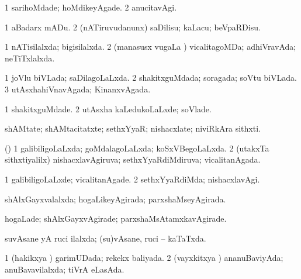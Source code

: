 \bentry
{} 
\gl{\kirxvi}
\expl{}
\bmng
\bnum
\num{1} sarihoMdade; hoMdikeyAgade. 
\num{2} anucitavAgi. 
\enum
\emng
\eentry

\bentry
{} 
\gl{\sakirx}
\expl{}
\bmng
\bnum
\num{1} aBadarx mADu. 
\num{2} (nATiruvudanunx) saDilisu; kaLacu; beVpaRDisu. 
\enum
\emng
\eentry

\bentry
{} 
\gl{\gu}
\expl{}
\bmng
\bnum
\num{1} nATisilalxda; bigisilalxda. 
\num{2} (manasusx \mo vugaLa \vi) vicalitagoMDa; adhiVravAda; neTiTxlalxda. 
\enum
\emng
\eentry

\bentry
{} 
\gl{\gu}
\expl{}
\bmng
\bnum
\num{1} joVlu biVLada; saDilagoLaLxda. 
\num{2} shakitxguMdada; soragada; soVtu biVLada. 
\num{3} utAsxhahiVnavAgada; KinanxvAgada. 
\enum
\emng
\eentry

\bentry
{} 
\gl{\kirxvi}
\expl{}
\bmng
\bnum
\num{1} shakitxguMdade. 
\num{2} utAsxha kaLedukoLaLxde; soVlade. 
\enum
\emng
\eentry

\bentry
{} 
\gl{\nA}
\expl{}
\bmng
 shAMtate; shAMtacitatxte; sethxYyaR; nishacxlate; niviRkAra sithxti. 
\emng
\eentry

\bentry
{} 
\gl{\gu}
\expl{}
\bmng
(\AmA) 
\bnum
\num{1} galibiligoLaLxda; goMdalagoLaLxda; koSxVBegoLaLxda. 
\num{2} (utakxTa sithxtiyalilx) nishacxlavAgiruva; sethxYyaRdiMdiruva; vicalitanAgada. 
\enum
\emng
\eentry

\bentry
{} 
\gl{\kirxvi}
\expl{}
\bmng
\bnum
\num{1} galibiligoLaLxde; vicalitanAgade. 
\num{2} sethxYyaRdiMda; nishacxlavAgi. 
\enum
\emng
\eentry

\bentry
{} 
\gl{\gu}
\expl{}
\bmng
 shAlxGayxvalalxda; hogaLikeyAgirada; parxshaMseyAgirada. 
\emng
\eentry

\bentry
{} 
\gl{\kirxvi}
\expl{}
\bmng
 hogaLade; shAlxGayxvAgirade; parxshaMsAtamxkavAgirade. 
\emng
\eentry

\bentry
{} 
\gl{\gu}
\expl{}
\bmng
suvAsane yA ruci ilalxda; (su)vAsane, ruci -- kaTaTxda. 
\emng
\eentry

\bentry
{} 
\gl{\gu}
\expl{}
\bmng
\bnum
\num{1} (hakikxya \vi) garimUDada; rekekx baliyada. 
\num{2} (vayxkitxya \vi) ananuBaviyAda; anuBavavilalxda; tiVrA eLasAda. 
\enum
\emng
\eentry

